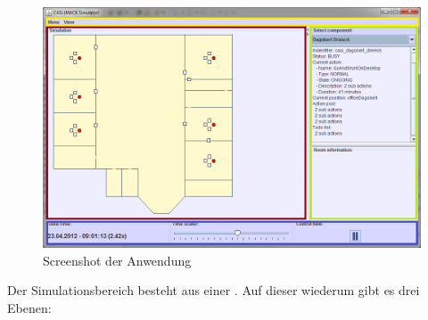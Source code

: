 \begin{figure}[htb]
  \begin{center}
    \includegraphics[width=\textwidth]{pics/screen2.png}
  \end{center}
  \caption{Screenshot der Anwendung}
  \label{fig:simplegui-screen}
\end{figure}

Der Simulationsbereich besteht aus einer . Auf dieser wiederum gibt es drei Ebenen:

